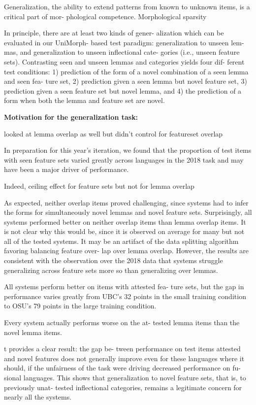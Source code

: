 \documentclass[11pt]{article}
\begin{document}
Generalization, the ability to extend patterns from known to unknown items, is a critical part of mor- phological competence. 
Morphological sparsity 

In principle, there are at least two kinds of gener- alization which can be evaluated in our UniMorph- based test paradigm: generalization to unseen lem- mas, and generalization to unseen inflectional cate- gories (i.e., unseen feature sets). Contrasting seen and unseen lemmas and categories yields four dif- ferent test conditions: 1) prediction of the form of a novel combination of a seen lemma and seen fea- ture set, 2) prediction given a seen lemma but novel feature set, 3) prediction given a seen feature set but novel lemma, and 4) the prediction of a form when both the lemma and feature set are novel.

\textbf{Motivation for the generalization task:} 

\citet{pimentel-ryskina-etal-2021-sigmorphon} looked at lemma overlap as well but didn't control for featureset overlap 

In preparation for this year’s iteration, we found that the proportion of test items with seen feature sets varied greatly across languages in the 2018 task and may have been a major driver of performance. 

Indeed, ceiling effect for feature sets but not for lemma overlap 


As expected, neither overlap items proved challenging, since systems had to infer the forms for simultaneously novel lemmas and novel feature sets. Surprisingly, all systems performed better on neither overlap items than lemma overlap items. It is not clear why this would be, since it is observed on average for many but not all of the tested systems. It may be an artifact of the data splitting algorithm favoring balancing feature over- lap over lemma overlap. However, the results are consistent with the observation over the 2018 data that systems struggle generalizing across feature sets more so than generalizing over lemmas.


All systems perform better on items with attested fea- ture sets, but the gap in performance varies greatly from UBC’s 32 points in the small training condition to OSU’s 79 points in the large training condition.

Every system actually performs worse on the at- tested lemma items than the novel lemma items.

t provides a clear result: the gap be- tween performance on test items attested and novel features does not generally improve even for these languages where it should, if the unfairness of the task were driving decreased performance on fu- sional languages. This shows that generalization to novel feature sets, that is, to previously unat- tested inflectional categories, remains a legitimate concern for nearly all the systems.
\end{document}
